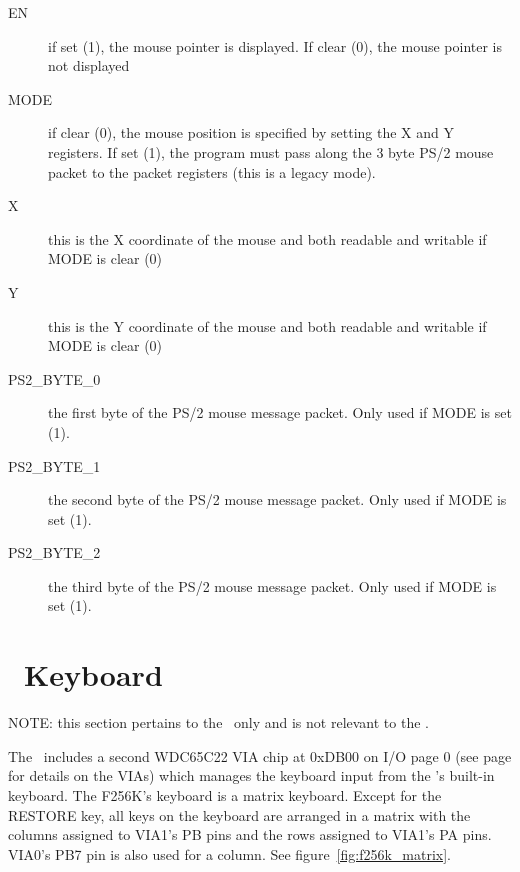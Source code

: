 \begin{description}
    \item[EN] if set (1), the mouse pointer is displayed. If clear (0), the mouse pointer is not displayed
    \item[MODE] if clear (0), the mouse position is specified by setting the X and Y registers. If set (1), the program must pass along the 3 byte PS/2 mouse packet to the packet registers (this is a legacy mode).
    \item[X] this is the X coordinate of the mouse and both readable and writable if MODE is clear (0)
    \item[Y] this is the Y coordinate of the mouse and both readable and writable if MODE is clear (0)
    \item[PS2\_BYTE\_0] the first byte of the PS/2 mouse message packet. Only used if MODE is set (1).
    \item[PS2\_BYTE\_1] the second byte of the PS/2 mouse message packet. Only used if MODE is set (1).
    \item[PS2\_BYTE\_2] the third byte of the PS/2 mouse message packet. Only used if MODE is set (1).
\end{description}

\section*{\fk\ Keyboard}
\label{sec_f256k_kbd}

\begin{leftbar}
    NOTE: this section pertains to the \fk\ only and is not relevant to the \jr.
\end{leftbar}

The \fk\ includes a second WDC65C22 VIA chip at 0xDB00 on I/O page 0 (see page \pageref{chap_via} for details on the VIAs) which manages the keyboard input from the \fk's built-in keyboard. The F256K's keyboard is a matrix keyboard. Except for the RESTORE key, all keys on the keyboard are arranged in a matrix with the columns assigned to VIA1's PB pins and the rows assigned to VIA1's PA pins. VIA0's PB7 pin is also used for a column. See figure~\ref{fig:f256k_matrix}.

